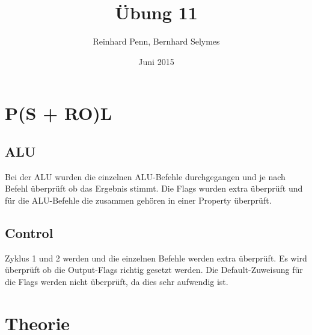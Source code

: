 \documentclass[12pt,a4paper]{article}
\begin{document}
\title{Übung 11}
\author{Reinhard Penn, Bernhard Selymes}
\date{Juni 2015}

\normalsize


\newcommand{\srcpath}{../../src}
\newcommand{\simpath}{../../sim}



\section{P(S + RO)L}
\subsection{ALU}
Bei der ALU wurden die einzelnen ALU-Befehle durchgegangen und je nach Befehl überprüft ob das Ergebnis stimmt. Die Flags wurden extra überprüft und für die ALU-Befehle die zusammen gehören in einer Property überprüft.

\subsection{Control}
Zyklus 1 und 2 werden und die einzelnen Befehle werden extra überprüft. Es wird überprüft ob die Output-Flags richtig gesetzt werden. Die Default-Zuweisung für die Flags werden nicht überprüft, da dies sehr aufwendig ist.

\section{Theorie}
\end{document}
